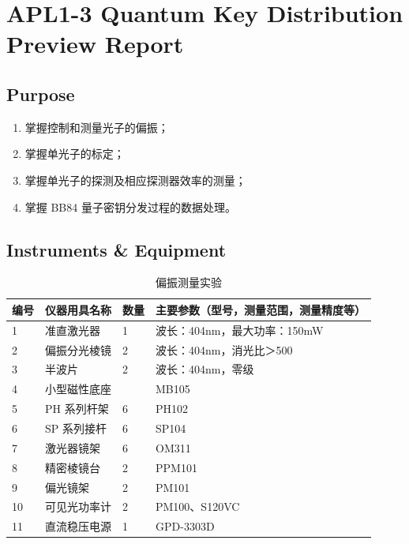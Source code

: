
\setcounter{section}{0}
\section{APL1-3 Quantum Key Distribution \\ Preview Report}


\subsection{Purpose}
\begin{enumerate}
	\item 掌握控制和测量光子的偏振；
	\item 掌握单光子的标定；
	\item 掌握单光子的探测及相应探测器效率的测量；
	\item 掌握 BB84 量子密钥分发过程的数据处理。
\end{enumerate}


\subsection{Instruments \& Equipment}
\begin{table}[htbp]
	\centering
	\renewcommand\arraystretch{1.6}
	\caption{偏振测量实验}
	\begin{tabular}{p{}|p{}|p{}|p{}}
		\hline
		编号& 仪器用具名称 & 数量 &  主要参数（型号，测量范围，测量精度等） \\
		\hline
		1	&	准直激光器 	& 1 & 波长：404nm，最大功率：150mW\\
		
		2	&	偏振分光棱镜 	& 2 & 波长：404nm，消光比＞500	 \\
		
		3	&	半波片 & 2 &	波长：404nm，零级 	\\
		
		4	&	小型磁性底座	&  & MB105	\\
		
		5	&	PH 系列杆架	& 6 & PH102	\\
		
		6	&	SP 系列接杆	& 6 & SP104 \\
		
		7	&	激光器镜架	& 6 & OM311	\\
		
		8	&	精密棱镜台	& 2 & PPM101	\\
		
		9	&	偏光镜架	& 2 & PM101	\\
		
		10	&	可见光功率计& 2 & PM100、S120VC	\\
		
		11	&	直流稳压电源& 1 & GPD-3303D	\\
		\hline
	\end{tabular}
\end{table}

